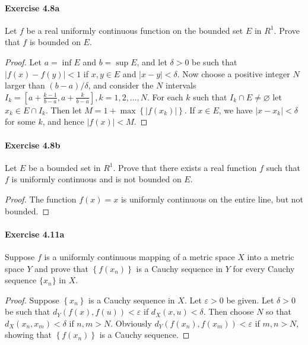\documentclass{article}
\theoremstyle{definition}
\begin{document}
\paragraph{Exercise 4.8a} Let $f$ be a real uniformly continuous function on the bounded set $E$ in $R^{1}$. Prove that $f$ is bounded on $E$.
\begin{proof}
    Let $a=\inf E$ and $b=\sup E$, and let $\delta>0$ be such that $|f(x)-f(y)|<1$ if $x, y \in E$ and $|x-y|<\delta$. Now choose a positive integer $N$ larger than $(b-a) / \delta$, and consider the $N$ intervals $I_k=\left[a+\frac{k-1}{b-a}, a+\frac{k}{b-a}\right], k=1,2, \ldots, N$. For each $k$ such that $I_k \cap E \neq \varnothing$ let $x_k \in E \cap I_k$. Then let $M=1+\max \left\{\left|f\left(x_k\right)\right|\right\}$. If $x \in E$, we have $\left|x-x_k\right|<\delta$ for some $k$, and hence $|f(x)|<M$.
\end{proof}



\paragraph{Exercise 4.8b} Let $E$ be a bounded set in $R^{1}$. Prove that there exists a real function $f$ such that $f$ is uniformly continuous and is not bounded on $E$.
\begin{proof}
    The function $f(x)=x$ is uniformly continuous on the entire line, but not bounded.
\end{proof}



\paragraph{Exercise 4.11a} Suppose $f$ is a uniformly continuous mapping of a metric space $X$ into a metric space $Y$ and prove that $\left\{f\left(x_{n}\right)\right\}$ is a Cauchy sequence in $Y$ for every Cauchy sequence $\{x_n\}$ in $X$.
\begin{proof}
    Suppose $\left\{x_n\right\}$ is a Cauchy sequence in $X$. Let $\varepsilon>0$ be given. Let $\delta>0$ be such that $d_Y(f(x), f(u))<\varepsilon$ if $d_X(x, u)<\delta$. Then choose $N$ so that $d_X\left(x_n, x_m\right)<\delta$ if $n, m>N$. Obviously $d_Y\left(f\left(x_n\right), f\left(x_m\right)\right)<\varepsilon$ if $m, n>N$, showing that $\left\{f\left(x_n\right)\right\}$ is a Cauchy sequence.
\end{proof}
\end{document}
